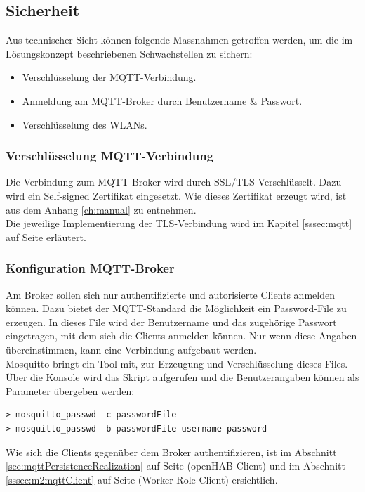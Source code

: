 \subsection{Sicherheit}
Aus technischer Sicht können folgende Massnahmen getroffen werden, um die im Lösungskonzept beschriebenen Schwachstellen zu sichern:
\begin{itemize}
	\item Verschlüsselung der MQTT-Verbindung.
	\item Anmeldung am MQTT-Broker durch Benutzername \& Passwort.
	\item Verschlüsselung des WLANs.
\end{itemize}

\subsubsection{Verschlüsselung MQTT-Verbindung}
Die Verbindung zum MQTT-Broker wird durch SSL/TLS Verschlüsselt. Dazu wird ein Self-signed Zertifikat eingesetzt. Wie dieses Zertifikat erzeugt wird, ist aus dem Anhang \ref{ch:manual} zu entnehmen. \\
Die jeweilige Implementierung der TLS-Verbindung wird im Kapitel \ref{sssec:mqtt} auf Seite \pageref{sssec:mqtt} erläutert.

\subsubsection{Konfiguration MQTT-Broker}
Am Broker sollen sich nur authentifizierte und autorisierte Clients anmelden können. Dazu bietet der MQTT-Standard die Möglichkeit ein Password-File zu erzeugen. In dieses File wird der Benutzername und das zugehörige Passwort eingetragen, mit dem sich die Clients anmelden können. Nur wenn diese Angaben übereinstimmen, kann eine Verbindung aufgebaut werden. \\
Mosquitto bringt ein Tool mit, zur Erzeugung und Verschlüsselung dieses Files. Über die Konsole wird das Skript aufgerufen und die Benutzerangaben können als Parameter übergeben werden:
\begin{lstlisting}[style=csharp, caption=mosquitto\_passwd.exe - generate password-file]
> mosquitto_passwd -c passwordFile
> mosquitto_passwd -b passwordFile username password
\end{lstlisting}
Wie sich die Clients gegenüber dem Broker authentifizieren, ist im Abschnitt \ref{sec:mqttPersistenceRealization} auf Seite \pageref{sec:mqttPersistenceRealization} (openHAB Client) und im Abschnitt \ref{sssec:m2mqttClient} auf Seite \pageref{sssec:m2mqttClient} (Worker Role Client) ersichtlich.

